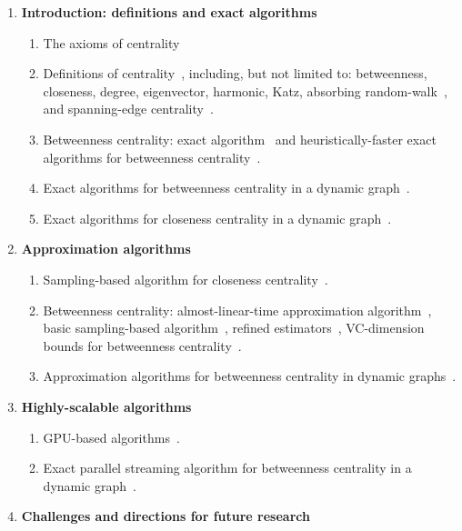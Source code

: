 \documentclass{sig-alternate}
\begin{document}
\begin{enumerate}
	\item {\bf Introduction: definitions and exact algorithms}
		\begin{enumerate}
			\item The axioms of centrality~\citep{BoldiV14}
			\item Definitions of centrality~\citep{Newman10}, including, but not
				limited to: betweenness, closeness, degree, eigenvector,
				harmonic, Katz, absorbing random-walk~\citep{MavroforakisMG15},
				and spanning-edge centrality~\citep{MavroforakisGLKT15}.
			\item Betweenness centrality: exact algorithm~\citep{Brandes01} and
				heuristically-faster exact algorithms for betweenness
				centrality~\citep{ErdosIBT15,SaryuceSKC13}.
			\item Exact algorithms for betweenness centrality in a dynamic
				graph~\citep{LeeLPCC12,NasrePR14,PontecorviR15}.
			\item Exact algorithms for closeness centrality in a dynamic
				graph~\citep{SariyuceKSC13b}.
		\end{enumerate}
	\item {\bf Approximation algorithms}
		\begin{enumerate}
			\item Sampling-based algorithm for closeness
				centrality~\citep{EppsteinW04}.
			\item Betweenness centrality: almost-linear-time approximation
				algorithm~\citep{Yoshida14}, basic sampling-based
				algorithm~\citep{BrandesP07}, refined
				estimators~\citep{GeisbergerSS08}, VC-dimension bounds for
				betweenness centrality~\citep{RiondatoK14WSDM,RiondatoK15}.
			\item Approximation algorithms for betweenness centrality in dynamic
				graphs~\citep{KasWCC13,BergaminiMS14,BergaminiM15}.
		\end{enumerate}
	\item {\bf Highly-scalable algorithms}
		\begin{enumerate}
			\item GPU-based algorithms~\citep{SariyuceKSC13}.
			\item Exact parallel streaming algorithm for betweenness centrality in a
				dynamic graph~\citep{KourtellisMB15}.
		\end{enumerate}
	\item {\bf Challenges and directions for future research}
\end{enumerate}
\end{document}
